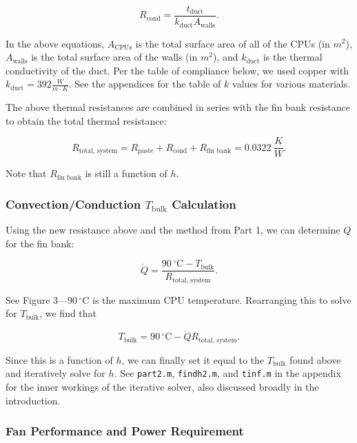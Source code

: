 \documentclass[12pt, titlepage]{article}
\begin{document}
\begin{equation}
R_{\text{cond}} = \frac{t_{\text{duct}}}{k_{\text{duct}} A_{\text{walls}}}.
\end{equation}

In the above equations, $A_{\text{CPUs}}$ is the total surface area of all of the CPUs (in $m^2$), $A_{\text{walls}}$ is the total surface area of the walls (in $m^2$), and $k_{\text{duct}}$ is the thermal conductivity of the duct. Per the table of compliance below, we used copper with $k_{\text{duct}} = 392 \tfrac{W}{m \cdot K}$. See the appendices for the table of $k$ values for various materials.

The above thermal resistances are combined in series with the fin bank resistance to obtain the total thermal resistance:

\begin{equation}
R_{\text{total, system}} = R_{\text{paste}} + R_{\text{cond}} + R_{\text{fin bank}} =  0.0322\ \frac{K}{W}.
\end{equation}

Note that $R_{\text{fin bank}}$ is still a function of $h$.

\subsubsection{Convection/Conduction $T_{\text{bulk}}$ Calculation}

Using the new resistance above and the method from Part 1, we can determine $\dot{Q}$ for the fin bank:

\begin{equation}
\dot{Q} = \frac{90\,^\circ\mathrm{C} - T_{\text{bulk}}}{R_{\text{total, system}}}.
\end{equation}

See Figure 3---$90\,^\circ\mathrm{C}$ is the maximum CPU temperature. Rearranging this to solve for $T_{\text{bulk}}$, we find that

\begin{equation}
T_{\text{bulk}} = 90\,^\circ\mathrm{C} - \dot{Q}R_{\text{total, system}}.
\end{equation}

Since this is a function of $h$, we can finally set it equal to the $T_{\text{bulk}}$ found above and iteratively solve for $h$. See \texttt{part2.m}, \texttt{findh2.m}, and \texttt{tinf.m} in the appendix for the inner workings of the iterative solver, also discussed broadly in the introduction.

\subsubsection{Fan Performance and Power Requirement}
\end{document}
